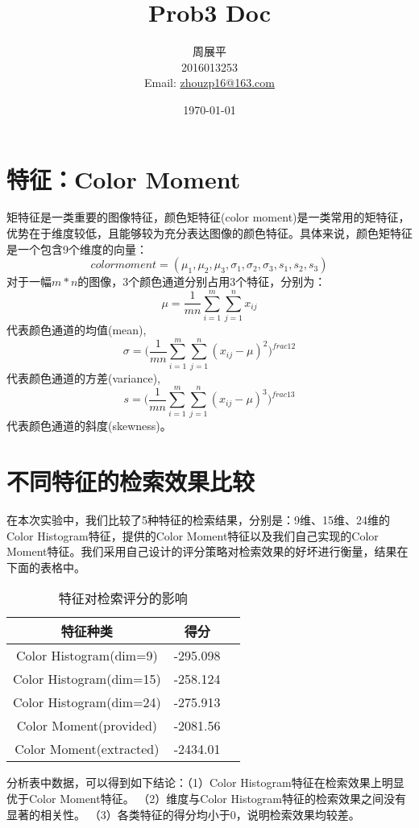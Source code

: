\documentclass[12pt]{article}
\title{Prob3 Doc}
\author{周展平\\2016013253\\Email: \href{mailto:zhouzp16@163.com}{zhouzp16@163.com}}
\date{\today}
\begin{document}
  \maketitle
  \section*{特征：Color Moment}
    矩特征是一类重要的图像特征，颜色矩特征(color moment)是一类常用的矩特征，优势在于维度较低，且能够较为充分表达图像的颜色特征。具体来说，颜色矩特征是一个包含9个维度的向量：
    \begin{equation*}
    color moment = (\mu_1,\mu_2,\mu_3,\sigma_1,\sigma_2,\sigma_3,s_1,s_2,s_3)
    \end{equation*}
    对于一幅$m*n$的图像，3个颜色通道分别占用3个特征，分别为：
    \begin{equation*}
    \mu=\frac{1}{mn}\sum_{i=1}^{m}\sum_{j=1}^{n}x_{ij}
    \end{equation*}
    代表颜色通道的均值(mean),
    \begin{equation*}
    \sigma=\big(\frac{1}{mn}\sum_{i=1}^{m}\sum_{j=1}^{n}(x_{ij}-\mu)^2\big)^{frac{1}{2}}
    \end{equation*}
    代表颜色通道的方差(variance),
    \begin{equation*}
    s=\big(\frac{1}{mn}\sum_{i=1}^{m}\sum_{j=1}^{n}(x_{ij}-\mu)^3\big)^{frac{1}{3}}
    \end{equation*}
    代表颜色通道的斜度(skewness)。
  \section*{不同特征的检索效果比较}
    在本次实验中，我们比较了5种特征的检索结果，分别是：9维、15维、24维的Color Histogram特征，提供的Color Moment特征以及我们自己实现的Color Moment特征。我们采用自己设计的评分策略对检索效果的好坏进行衡量，结果在下面的表格中。
    \begin{table} \caption {特征对检索评分的影响} \centering
       \begin{tabular}{ccc}
        \toprule  %
        特征种类& 得分\\
        \midrule  %
        Color Histogram(dim=9) & -295.098 \\
        Color Histogram(dim=15) & -258.124\\
        Color Histogram(dim=24) & -275.913\\
        Color Moment(provided) & -2081.56\\
        Color Moment(extracted) & -2434.01\\
        \bottomrule %
        \end{tabular}
    \end{table}
    分析表中数据，可以得到如下结论：（1）Color Histogram特征在检索效果上明显优于Color Moment特征。 （2）维度与Color Histogram特征的检索效果之间没有显著的相关性。 （3）各类特征的得分均小于0，说明检索效果均较差。
\end{document}
